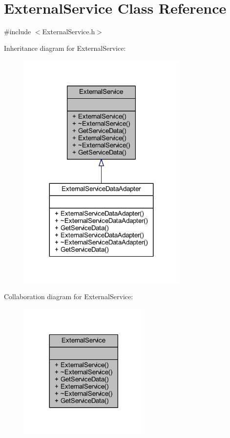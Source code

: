 \hypertarget{class_external_service}{}\section{External\+Service Class Reference}
\label{class_external_service}


{\ttfamily \#include $<$External\+Service.\+h$>$}



Inheritance diagram for External\+Service\+:\nopagebreak
\begin{figure}[H]
\begin{center}
\leavevmode
\includegraphics[width=239pt]{class_external_service__inherit__graph}
\end{center}
\end{figure}


Collaboration diagram for External\+Service\+:\nopagebreak
\begin{figure}[H]
\begin{center}
\leavevmode
\includegraphics[width=185pt]{class_external_service__coll__graph}
\end{center}
\end{figure}

